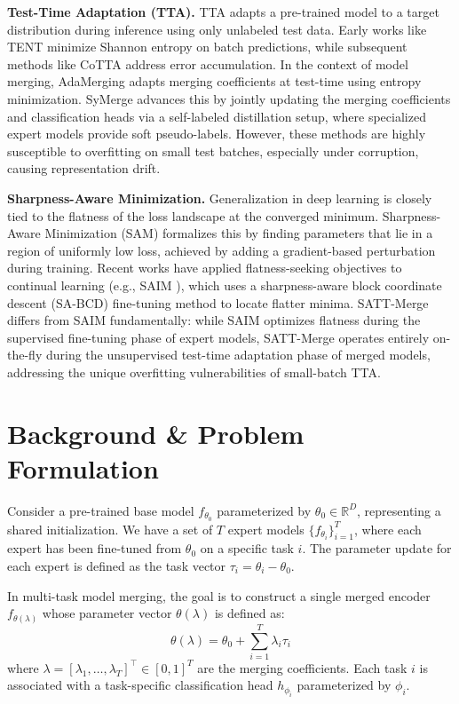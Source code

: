 \documentclass{article}
\begin{document}
\textbf{Test-Time Adaptation (TTA).} TTA adapts a pre-trained model to a target distribution during inference using only unlabeled test data. Early works like TENT \cite{lee2024entropy} minimize Shannon entropy on batch predictions, while subsequent methods like CoTTA address error accumulation. In the context of model merging, AdaMerging \cite{yang2023adamerging} adapts merging coefficients at test-time using entropy minimization. SyMerge \cite{symerge2024} advances this by jointly updating the merging coefficients and classification heads via a self-labeled distillation setup, where specialized expert models provide soft pseudo-labels. However, these methods are highly susceptible to overfitting on small test batches, especially under corruption, causing representation drift.

\textbf{Sharpness-Aware Minimization.} Generalization in deep learning is closely tied to the flatness of the loss landscape at the converged minimum. Sharpness-Aware Minimization (SAM) \cite{saim2026} formalizes this by finding parameters that lie in a region of uniformly low loss, achieved by adding a gradient-based perturbation during training. Recent works have applied flatness-seeking objectives to continual learning (e.g., SAIM \cite{saim2026}), which uses a sharpness-aware block coordinate descent (SA-BCD) fine-tuning method to locate flatter minima. SATT-Merge differs from SAIM fundamentally: while SAIM optimizes flatness during the supervised fine-tuning phase of expert models, SATT-Merge operates entirely on-the-fly during the unsupervised test-time adaptation phase of merged models, addressing the unique overfitting vulnerabilities of small-batch TTA.

\section{Background \& Problem Formulation}
\label{sec:background}

Consider a pre-trained base model $f_{\theta_0}$ parameterized by $\theta_0 \in \mathbb{R}^D$, representing a shared initialization. We have a set of $T$ expert models $\{f_{\theta_i}\}_{i=1}^T$, where each expert has been fine-tuned from $\theta_0$ on a specific task $i$. The parameter update for each expert is defined as the task vector $\tau_i = \theta_i - \theta_0$.

In multi-task model merging, the goal is to construct a single merged encoder $f_{\theta(\lambda)}$ whose parameter vector $\theta(\lambda)$ is defined as:
\begin{equation}
    \theta(\lambda) = \theta_0 + \sum_{i=1}^T \lambda_i \tau_i
\end{equation}
where $\lambda = [\lambda_1, \dots, \lambda_T]^\top \in [0, 1]^T$ are the merging coefficients. Each task $i$ is associated with a task-specific classification head $h_{\phi_i}$ parameterized by $\phi_i$.
\end{document}
